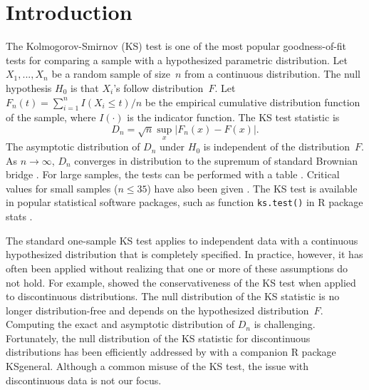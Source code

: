 \documentclass[12pt, letterpaper]{article}
\begin{document}

\section{Introduction}
\label{sec:intro}

The Kolmogorov-Smirnov (KS) test is one of the most popular goodness-of-fit
tests for comparing a sample with a hypothesized parametric distribution.
Let $X_1, ..., X_n$ be a random sample of size~$n$ from a continuous
distribution. The null hypothesis $H_0$ is that $X_i$'s follow distribution~$F$.
Let $F_n(t) = \sum_{i=1}^n I(X_i \le t) / n$ be the empirical cumulative
distribution function of the sample, where $I(\cdot)$ is the indicator
function. The KS test statistic is
\begin{equation}
  \label{eq:ks_standard}
  D_n = \sqrt{n} \sup_x | F_{n}(x) - F(x) |.
\end{equation}
The asymptotic distribution of $D_n$ under $H_0$ is independent of the
distribution~$F$. As $n \to \infty$, $D_n$ converges in distribution to
the supremum of standard Brownian bridge \citep{kolmogorov1933sulla}. For large
samples, the tests can be performed with a table \citep{smirnov1948table}.
Critical values for small samples ($n \le 35$) have also been given
\citep{massey1951kolmogorov}. The KS test is available in popular
statistical software packages, such as function \texttt{ks.test()} in R package
\textsf{stats} \citep{R, marsaglia2003evaluating}.


The standard one-sample KS test applies to independent data with a continuous
hypothesized distribution that is completely specified. In practice, however, it
has often been applied without realizing that one or more of these assumptions
do not hold. For example, \citet{noether1963note} showed the conservativeness of
the KS test when applied to discontinuous distributions. The null distribution
of the KS statistic is no longer distribution-free and depends on the
hypothesized distribution~$F$. Computing the
exact and asymptotic distribution of $D_n$ is challenging. Fortunately, the null
distribution of the KS statistic for discontinuous distributions has been
efficiently addressed by \citet{dimitrova2020computing} with a
companion R package \textsf{KSgeneral}. Although a common misuse of the KS test, 
the issue with discontinuous data is not our focus.
\end{document}

